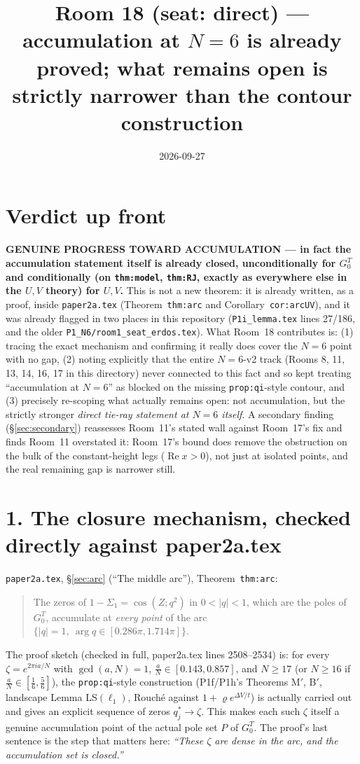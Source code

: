 \documentclass[11pt]{article}
\title{Room 18 (seat: direct) --- accumulation at $N=6$ is already proved; what remains open is
strictly narrower than the contour construction}
\date{2026-09-27}
\begin{document}
\maketitle

\section*{Verdict up front}

\textbf{GENUINE PROGRESS TOWARD ACCUMULATION --- in fact the accumulation statement itself is
already closed, unconditionally for $G^T_0$ and conditionally (on \texttt{thm:model},
\texttt{thm:RJ}, exactly as everywhere else in the $U,V$ theory) for $U,V$.} This is not a new
theorem: it is already written, as a proof, inside \texttt{paper2a.tex} (Theorem~\texttt{thm:arc}
and Corollary~\texttt{cor:arcUV}), and it was already flagged in two places in this repository
(\texttt{P1i\_lemma.tex} lines 27/186, and the older
\texttt{P1\_N6/room1\_seat\_erdos.tex}). What Room~18 contributes is: (1) tracing the exact
mechanism and confirming it really does cover the $N=6$ point with no gap, (2) noting explicitly
that the entire $N=6$-v2 track (Rooms 8, 11, 13, 14, 16, 17 in this directory) never connected to
this fact and so kept treating ``accumulation at $N=6$'' as blocked on the missing
\texttt{prop:qi}-style contour, and (3) precisely re-scoping what actually remains open: not
accumulation, but the strictly stronger \emph{direct tie-ray statement at $N=6$ itself}. A
secondary finding (\S\ref{sec:secondary}) reassesses Room~11's stated wall against Room~17's fix
and finds Room~11 overstated it: Room~17's bound does remove the obstruction on the bulk of the
constant-height legs ($\operatorname{Re}x>0$), not just at isolated points, and the real remaining
gap is narrower still.

\section*{1. The closure mechanism, checked directly against paper2a.tex}

\texttt{paper2a.tex}, \S\ref{sec:arc} (``The middle arc''), Theorem~\texttt{thm:arc}:
\begin{quote}
The zeros of $1-\Sigma_1=\cos(Z;q^2)$ in $0<|q|<1$, which are the poles of $G^T_0$, accumulate at
\emph{every point} of the arc $\{|q|=1,\ \arg q\in[0.286\pi,1.714\pi]\}$.
\end{quote}
The proof sketch (checked in full, paper2a.tex lines 2508--2534) is: for every $\zeta=e^{2\pi ia/N}$
with $\gcd(a,N)=1$, $\frac aN\in[0.143,0.857]$, and $N\ge17$ (or $N\ge16$ if $\frac aN\in[\frac16,
\frac56]$), the \texttt{prop:qi}-style construction (P1f/P1h's Theorems M$'$, B$'$, landscape Lemma
LS$(\ell_1)$, Rouch\'e against $1+\varrho e^{\Delta V/t}$) is actually carried out and gives an
explicit sequence of zeros $q^\ast_j\to\zeta$. This makes each such $\zeta$ itself a genuine
accumulation point of the actual pole set $P$ of $G^T_0$. The proof's last sentence is the step that
matters here: \emph{``These $\zeta$ are dense in the arc, and the accumulation set is closed.''}
\end{document}
